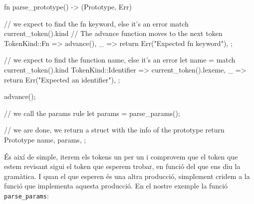 ﻿\documentclass{article}
\begin{document}
\begin{code}
fn parse_prototype() -> (Prototype, Err) {
    // we expect to find the fn keyword, else it's an error
    match current_token().kind {
        // The advance function moves to the next token
        TokenKind::Fn => advance(),
        _ => return Err("Expected fn keyword"),
    };

    // we expect to find the function name, else it's an error
    let name = match current_token().kind {
        TokenKind::Identifier => current_token().lexeme,
        _ => return Err("Expected an identifier"),
    };

    advance();

    // we call the params rule
    let params = parse_params();

    // we are done, we return a struct with the info of the prototype
    return Prototype { 
        name,
        params,
    };
}
\end{code}

És així de simple, iterem els tokens un per un i comprovem que el token que
estem revisant sigui el token que esperem trobar, en funció del que ens diu la
gramàtica. I quan el que esperen és una altra producció, simplement cridem a la
funció que implementa aquesta producció. En el nostre exemple la funció
\texttt{parse\_params}:
\end{document}
